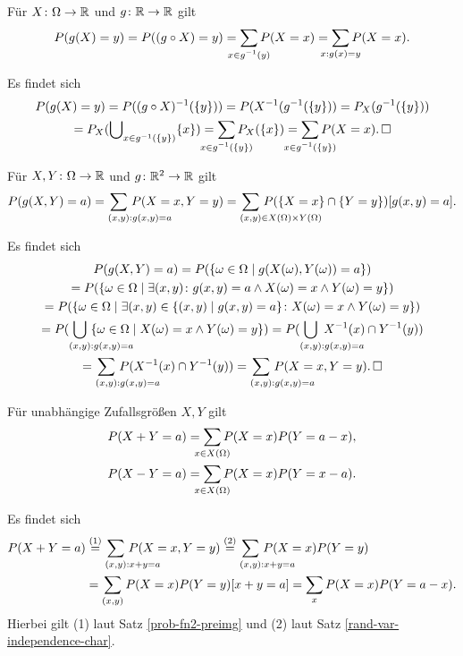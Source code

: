 \newpage
\begin{Satz}
Für $X\colon\Omega\to\mathbb R$ und $g\colon\mathbb R\to\mathbb R$ gilt
\[P(g(X)=y) = P((g\circ X) = y) = \sum_{\mathclap{x\in g^{-1}(y)}} P(X=x)
= \sum_{\mathclap{x:g(x)=y}} P(X=x).\]
\end{Satz}
\begin{Beweis}
Es findet sich
\begin{gather*}
P(g(X)=y) = P((g\circ X)^{-1}(\{y\})) = P(X^{-1}(g^{-1}(\{y\}))
= P_X(g^{-1}(\{y\}))\\
= P_X(\bigcup\nolimits_{x\in g^{-1}(\{y\})} \{x\})
= \sum_{\mathclap{x\in g^{-1}(\{y\})}} P_X(\{x\})
= \sum_{\mathclap{x\in g^{-1}(\{y\})}} P(X=x).\,\qedsymbol
\end{gather*}
\end{Beweis}

\begin{Satz}\label{prob-fn2-preimg}
Für $X,Y\colon\Omega\to\mathbb R$ und $g\colon\mathbb R^2\to\mathbb R$ gilt
\[P(g(X,Y)=a) = \sum_{(x,y)\mathrlap{:g(x,y)=a}}P(X=x, Y=y)
= \sum_{(x,y)\mathrlap{\in X(\Omega)\times Y(\Omega)}} P(\{X=x\}\cap\{Y=y\})[g(x,y)=a].\]
\end{Satz}
\begin{Beweis}
Es findet sich
\begin{gather*}
P(g(X,Y)=a) = P(\{\omega\in\Omega\mid g(X(\omega),Y(\omega))=a\})\\
= P(\{\omega\in\Omega\mid \exists (x,y)\colon g(x,y)=a\land X(\omega)=x\land Y(\omega)=y\})\\
= P(\{\omega\in\Omega\mid \exists (x,y)\in \{(x,y)\mid g(x,y)=a\}\colon X(\omega)=x\land Y(\omega)=y\})\\
= P(\bigcup_{(x,y)\mathrlap{:g(x,y)=a}} \{\omega\in\Omega\mid X(\omega)=x\land Y(\omega)=y\})
= P(\bigcup_{(x,y)\mathrlap{:g(x,y)=a}} X^{-1}(x)\cap Y^{-1}(y))\\
= \sum_{(x,y)\mathrlap{:g(x,y)=a}} P(X^{-1}(x)\cap Y^{-1}(y))
= \sum_{(x,y)\mathrlap{:g(x,y)=a}} P(X=x,Y=y).\,\qedsymbol
\end{gather*}
\end{Beweis}

\begin{Satz}
Für unabhängige Zufallsgrößen $X,Y$ gilt
\begin{gather*}
P(X+Y=a) = \sum_{\mathclap{x\in X(\Omega)}} P(X=x)P(Y=a-x),\\
P(X-Y=a) = \sum_{\mathclap{x\in X(\Omega)}} P(X=x)P(Y=x-a).
\end{gather*}
\end{Satz}
\begin{Beweis}
Es findet sich
\begin{align*}
P(X+Y=a) &\stackrel{\text(1)}= \sum_{(x,y)\mathrlap{:x+y=a}} P(X=x,Y=y)
\stackrel{\text(2)}= \sum_{(x,y)\mathrlap{:x+y=a}}P(X=x)P(Y=y)\\
&= \sum_{(x,y)}P(X=x)P(Y=y)[x+y=a]
= \sum_x P(X=x)P(Y=a-x).
\end{align*}
Hierbei gilt (1) laut Satz \ref{prob-fn2-preimg}
und (2) laut Satz \ref{rand-var-independence-char}.\,\qedsymbol
\end{Beweis}

